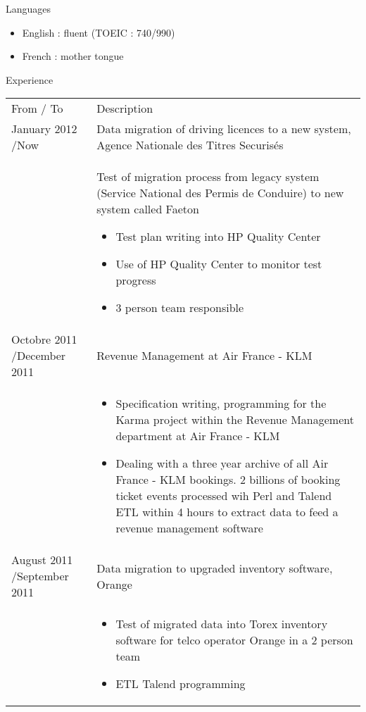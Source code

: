 \documentclass[a4paper,11pt]{letter}
\begin{document}
Languages
\begin{itemize}
\item    English : fluent (TOEIC : 740/990)
\item    French : mother tongue
\end{itemize}

Experience

\begin{tabular}{p{}p{}}
From / To & Description \\
January 2012 \slash Now & Data migration of driving licences to a new system, Agence Nationale des Titres Securis\'es \\
	

 & Test of migration process from legacy system (Service National des Permis de Conduire) to new system called Faeton 
\begin{itemize}
\item Test plan writing into HP Quality Center
\item Use of HP Quality Center to monitor test progress
\item 3 person team responsible
\end{itemize} \\
	

Octobre 2011 \slash December 2011 & Revenue Management at Air France - KLM \\

     & 
\begin{itemize}
\item Specification writing, programming for the Karma project within the Revenue Management department at Air France - KLM

\item Dealing with a three year archive of all Air France - KLM bookings. 2 billions of booking ticket events processed wih Perl and Talend ETL within 4 hours to extract data to feed a revenue management software
\end{itemize} \\
	

August 2011 \slash September 2011 & Data migration to upgraded inventory software, Orange \\
& \begin{itemize}
\item Test of migrated data into Torex inventory software for telco operator Orange in a 2 person team
\item ETL Talend programming
\end{itemize} \\


\end{tabular}
\end{document}
